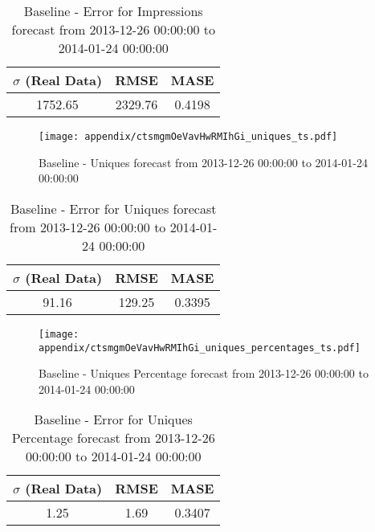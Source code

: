 \begin{table}[H]
\centering
\footnotesize
\begin{tabular}{ccc}
$\sigma$ (Real Data) & RMSE & MASE   \\ \hline
1752.65 & 2329.76 & 0.4198 \\
\end{tabular}

\vspace{0.5cm}

\caption{
Baseline - Error for Impressions forecast from 2013-12-26 00:00:00 to 2014-01-24 00:00:00}
\end{table}

\begin{figure}[H] \begin{center} \leavevmode
\texttt{[image: appendix/ctsmgmOeVavHwRMIhGi\_uniques\_ts.pdf]} \caption{
Baseline - Uniques forecast from 2013-12-26 00:00:00 to 2014-01-24 00:00:00} \label{fig:appendix/ctsmgmOeVavHwRMIhGi_uniques_ts.pdf} \end{center}
\end{figure}

\begin{table}[H]
\centering
\footnotesize
\begin{tabular}{ccc}
$\sigma$ (Real Data) & RMSE & MASE   \\ \hline
91.16 & 129.25 & 0.3395 \\
\end{tabular}

\vspace{0.5cm}

\caption{
Baseline - Error for Uniques forecast from 2013-12-26 00:00:00 to 2014-01-24 00:00:00}
\end{table}

\begin{figure}[H] \begin{center} \leavevmode
\texttt{[image: appendix/ctsmgmOeVavHwRMIhGi\_uniques\_percentages\_ts.pdf]} \caption{
Baseline - Uniques Percentage forecast from 2013-12-26 00:00:00 to 2014-01-24 00:00:00} \label{fig:appendix/ctsmgmOeVavHwRMIhGi_uniques_percentages_ts.pdf} \end{center}
\end{figure}

\begin{table}[H]
\centering
\footnotesize
\begin{tabular}{ccc}
$\sigma$ (Real Data) & RMSE & MASE   \\ \hline
1.25 & 1.69 & 0.3407 \\
\end{tabular}

\vspace{0.5cm}

\caption{
Baseline - Error for Uniques Percentage forecast from 2013-12-26 00:00:00 to 2014-01-24 00:00:00}
\end{table}

